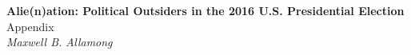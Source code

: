 \documentclass[12pt]{article}
\begin{document}
\clearpage
\printbibliography


\clearpage
\appendix
\begin{titlepage}
   \begin{center}
      \Large\textbf{Alie(n)ation: Political Outsiders in the 2016 U.S. Presidential Election}\\
      \large Appendix \\
      \large\textit{Maxwell B. Allamong}
   \end{center}
\end{titlepage}
\end{document}
